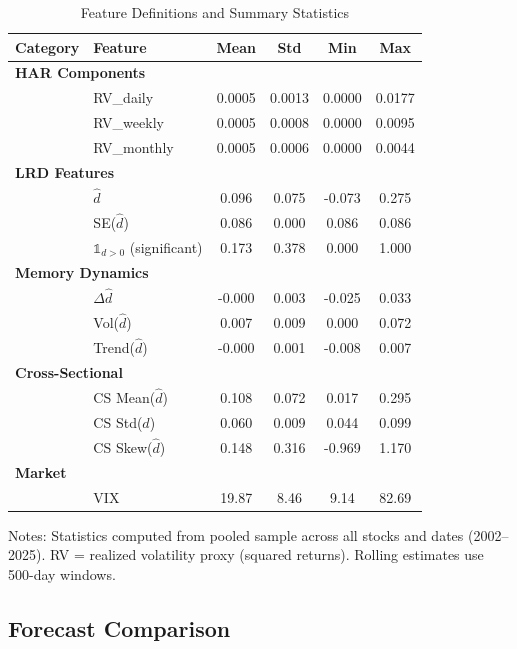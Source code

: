 \documentclass[12pt,a4paper]{article}
\begin{document}
\begin{table}[htbp]
\centering
\caption{Feature Definitions and Summary Statistics}
\label{tab:features}
\small
\begin{tabular}{llcccc}
\toprule
Category & Feature & Mean & Std & Min & Max \\
\midrule
\multicolumn{6}{l}{\textbf{HAR Components}} \\
  & RV\_daily & 0.0005 & 0.0013 & 0.0000 & 0.0177 \\
  & RV\_weekly & 0.0005 & 0.0008 & 0.0000 & 0.0095 \\
  & RV\_monthly & 0.0005 & 0.0006 & 0.0000 & 0.0044 \\
\midrule
\multicolumn{6}{l}{\textbf{LRD Features}} \\
  & $\hat{d}$ & 0.096 & 0.075 & -0.073 & 0.275 \\
  & SE($\hat{d}$) & 0.086 & 0.000 & 0.086 & 0.086 \\
  & $\mathbb{1}_{d>0}$ (significant) & 0.173 & 0.378 & 0.000 & 1.000 \\
\midrule
\multicolumn{6}{l}{\textbf{Memory Dynamics}} \\
  & $\Delta\hat{d}$ & -0.000 & 0.003 & -0.025 & 0.033 \\
  & Vol($\hat{d}$) & 0.007 & 0.009 & 0.000 & 0.072 \\
  & Trend($\hat{d}$) & -0.000 & 0.001 & -0.008 & 0.007 \\
\midrule
\multicolumn{6}{l}{\textbf{Cross-Sectional}} \\
  & CS Mean($\hat{d}$) & 0.108 & 0.072 & 0.017 & 0.295 \\
  & CS Std($\hat{d}$) & 0.060 & 0.009 & 0.044 & 0.099 \\
  & CS Skew($\hat{d}$) & 0.148 & 0.316 & -0.969 & 1.170 \\
\midrule
\multicolumn{6}{l}{\textbf{Market}} \\
  & VIX & 19.87 & 8.46 & 9.14 & 82.69 \\
\bottomrule
\end{tabular}
\begin{tablenotes}\small
\item Notes: Statistics computed from pooled sample across all stocks and dates (2002--2025). RV = realized volatility proxy (squared returns). Rolling estimates use 500-day windows.
\end{tablenotes}
\end{table}

\subsection{Forecast Comparison}
\end{document}
